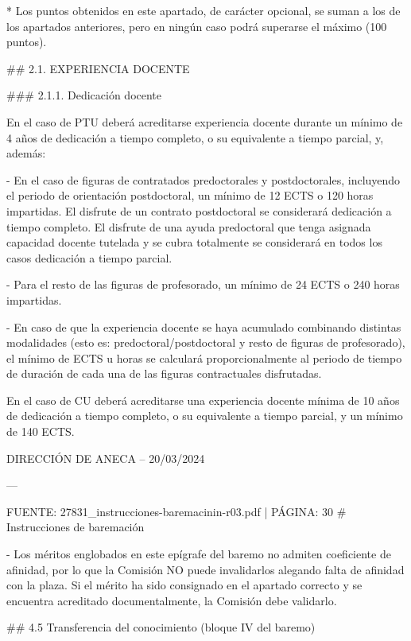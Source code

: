 \documentclass{article}
\begin{document}
\begin{itemize}
\begin{itemize}
\begin{scriptsize}
                  * Los puntos obtenidos en este apartado, de carácter opcional, se suman a los de los apartados anteriores, pero en ningún caso podrá superarse el máximo (100 puntos).

                  \#\# 2.1. EXPERIENCIA DOCENTE

                  \#\#\# 2.1.1. Dedicación docente

                  En el caso de PTU deberá acreditarse experiencia docente durante un mínimo de 4 años de dedicación a tiempo completo, o su equivalente a tiempo parcial, y, además:

                  - En el caso de figuras de contratados predoctorales y postdoctorales, incluyendo el periodo de orientación postdoctoral, un mínimo de 12 ECTS o 120 horas impartidas. El disfrute de un contrato postdoctoral se considerará dedicación a tiempo completo. El disfrute de una ayuda predoctoral que tenga asignada capacidad docente tutelada y se cubra totalmente se considerará en todos los casos dedicación a tiempo parcial.

                  - Para el resto de las figuras de profesorado, un mínimo de 24 ECTS o 240 horas impartidas.

                  - En caso de que la experiencia docente se haya acumulado combinando distintas modalidades (esto es: predoctoral/postdoctoral y resto de figuras de profesorado), el mínimo de ECTS u horas se calculará proporcionalmente al periodo de tiempo de duración de cada una de las figuras contractuales disfrutadas.

                  En el caso de CU deberá acreditarse una experiencia docente mínima de 10 años de dedicación a tiempo completo, o su equivalente a tiempo parcial, y un mínimo de 140 ECTS.

                  DIRECCIÓN DE ANECA – 20/03/2024

                  ---

                  FUENTE: 27831\_instrucciones-baremacinin-r03.pdf | PÁGINA: 30
                  \# Instrucciones de baremación

                  - Los méritos englobados en este epígrafe del baremo no admiten coeficiente de afinidad, por lo que la Comisión NO puede invalidarlos alegando falta de afinidad con la plaza. Si el mérito ha sido consignado en el apartado correcto y se encuentra acreditado documentalmente, la Comisión debe validarlo.

                  \#\# 4.5 Transferencia del conocimiento (bloque IV del baremo)


\end{scriptsize}
\end{itemize}
\end{itemize}
\end{document}
